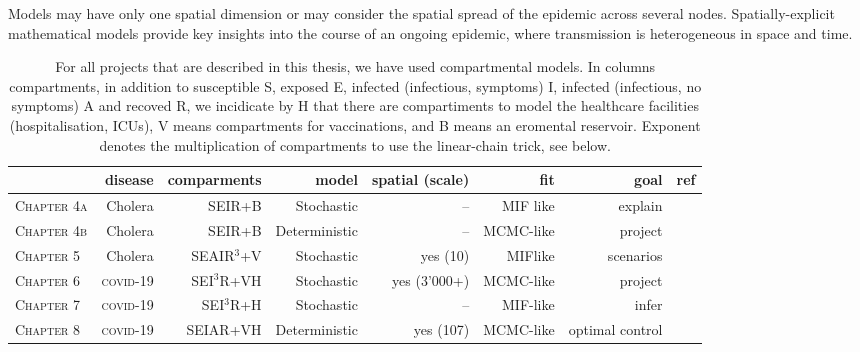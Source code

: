 Models may have only one spatial dimension or may consider the spatial spread of the epidemic across several nodes. Spatially-explicit mathematical models provide key insights into the course of an ongoing epidemic, where transmission is heterogeneous in space and time.

\begin{table*}[t]
\label{tab:allmodels}
\centering
\begin{tabular}{lrrrrrrr}
\toprule
                    & disease           & comparments & model         & spatial (scale) & fit       & goal            & ref\\
\midrule
\textsc{Chapter 4a} & Cholera           & SEIR+B      & Stochastic    & --              & MIF like  & explain         & \parencite{Lemaitre:RainfallDriverEpidemic:2019}\\
\textsc{Chapter 4b} & Cholera           & SEIR+B      & Deterministic & --              & MCMC-like & project         & \parencite{Lemaitre:RainfallDriverEpidemic:2019}\\
\textsc{Chapter 5}  & Cholera           & SEAIR$^3$+V & Stochastic    & yes (10)        & MIFlike   & scenarios       & \parencite{Lee:AchievingCoordinatedNational:2020} \\ \addlinespace
\textsc{Chapter 6}  & \textsc{covid}-19 & SEI$^3$R+VH & Stochastic    & yes (3'000+)    & MCMC-like & project         & \parencite{Lemaitre:ScenarioModelingPipeline:2021} \\
\textsc{Chapter 7}  & \textsc{covid}-19  & SEI$^3$R+H  & Stochastic    & --              & MIF-like  & infer           & \parencite{Lemaitre:AssessingImpactNonpharmaceutical:2020}\\
\textsc{Chapter 8}  & \textsc{covid}-19  & SEIAR+VH    & Deterministic & yes (107)       & MCMC-like & optimal control & \parencite{Lemaitre:OptimizingSpatiotemporalAllocation:2021}\\ 
\bottomrule
\end{tabular}
\caption[Comparison of the different models presented in this thesis]{For all projects that are described in this thesis, we have used compartmental models. In columns compartments, in addition to susceptible S, exposed E, infected (infectious, symptoms) I, infected (infectious, no symptoms) A and recoved R, we incidicate by H that there are compartiments to model the healthcare facilities (hospitalisation, ICUs), V means compartments for vaccinations, and B means an eromental reservoir. Exponent denotes the multiplication of compartments to use the linear-chain trick, see below.}
\end{table*}

